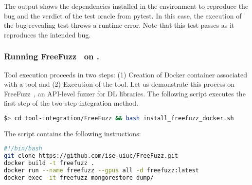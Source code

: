 \documentclass[sigconf,screen]{acmart}
\begin{document}
The output shows the dependencies installed in the environment to
reproduce the bug and the verdict of the test oracle from pytest. In
this case, the execution of the bug-revealing test throws a runtime
error. Note that this test passes as it reproduces the intended bug.



\subsubsection{Running FreeFuzz~\cite{wei2022free} on \tname.}

Tool execution proceeds in two steps: (1) Creation of Docker container
associated with a tool and (2) Execution of the tool.  Let us
demonstrate this process on FreeFuzz~\cite{wei2022free}, an API-level
fuzzer for DL libraries. The following script executes the first step
of the two-step integration method.




\begin{lstlisting}[language=bash,basicstyle=\small,keywords={}]
$> cd tool-integration/FreeFuzz && bash install_freefuzz_docker.sh
\end{lstlisting}

\noindent
The script  contains the
following instructions:

\begin{lstlisting}[language=bash,basicstyle=\small,keywords={}]
#!/bin/bash
git clone https://github.com/ise-uiuc/FreeFuzz.git
docker build -t freefuzz .
docker run --name freefuzz --gpus all -d freefuzz:latest
docker exec -it freefuzz mongorestore dump/
\end{lstlisting}

\end{document}
